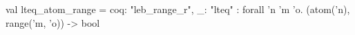 val lteq_atom_range = {coq: "leb_range_r", _: "lteq"} : forall 'n 'm 'o. (atom('n), range('m, 'o)) -> bool
